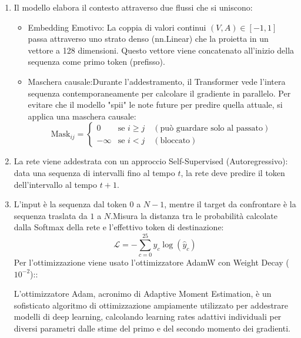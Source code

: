 \begin{enumerate}
    Nel 15\% dei casi di addestramento, i valori di Valenza e Arousal passati alla rete vengono impostati forzatamente a zero [0.0, 0.0].
    Si fa per Costringe il Transformer a imparare prima la struttura della sintassi musicale in modo indipendente ("incondizionato") e solo successivamente a correlarla alle emozioni, evitando che si affidi unicamente all'emozione ignorando la coerenza melodica, questa tecnica è nota come "Conditioning Dropout".
    \item Il modello elabora il contesto attraverso due flussi che si uniscono:
    \begin{itemize}
        \item     Embedding Emotivo: La coppia di valori continui $(V, A) \in [-1, 1]$ passa attraverso uno strato denso (nn.Linear) che la proietta in un vettore a 128 dimensioni. Questo vettore viene concatenato all'inizio della sequenza come primo token (prefisso).
        \item Maschera causale:Durante l'addestramento, il Transformer vede l'intera sequenza contemporaneamente per calcolare il gradiente in parallelo. Per evitare che il modello "spii" le note future per predire quella attuale, si applica una maschera causale:
        \[\text{Mask}_{ij} = \begin{cases} 0 & \text{se } i \ge j \quad (\text{può guardare solo al passato}) \\ -\infty & \text{se } i < j \quad (\text{bloccato}) \end{cases}\]
    \end{itemize} 
    \item La rete viene addestrata con un approccio Self-Supervised (Autoregressivo): data una sequenza di intervalli fino al tempo $t$, la rete deve predire il token dell'intervallo al tempo $t+1$.
    \item L'input è la sequenza dal token $0$ a $N-1$, mentre il target da confrontare è la sequenza traslata da $1$ a $N$.Misura la distanza tra le probabilità calcolate dalla Softmax della rete e l'effettivo token di destinazione:$$\mathcal{L} = -\sum_{c=0}^{25} y_{c} \log(\hat{y}_{c})$$
     Per l'ottimizzazione viene usato l'ottimizzatore AdamW con Weight Decay ($10^{-2}$)::
     
     L'ottimizzatore Adam, acronimo di Adaptive Moment Estimation, è un sofisticato algoritmo di ottimizzazione ampiamente utilizzato per addestrare modelli di deep learning, calcolando learning rates adattivi individuali per diversi parametri dalle stime del primo e del secondo momento dei gradienti.


\end{enumerate}
